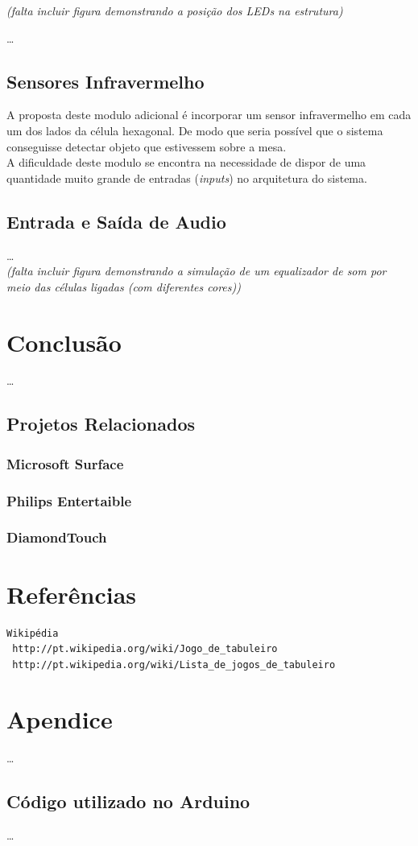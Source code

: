 \documentclass[a4paper,10pt]{article}
\begin{document}
{\it (falta incluir figura demonstrando a posição dos LEDs na estrutura)}

\ldots

\subsection{Sensores Infravermelho}

A proposta deste modulo adicional é incorporar um sensor infravermelho em cada um dos lados da célula hexagonal. De modo que seria possível que o sistema conseguisse detectar objeto que estivessem sobre a mesa. \\

A dificuldade deste modulo se encontra na necessidade de dispor de uma quantidade muito grande de entradas ({\it inputs}) no arquitetura do sistema.

\subsection{Entrada e Saída de Audio}

\ldots \\

{\it (falta incluir figura demonstrando a simulação de um equalizador de som por meio das células ligadas (com diferentes cores))}

\section{Conclusão}

\ldots

\subsection{Projetos Relacionados}

\subsubsection{Microsoft Surface}
\subsubsection{Philips Entertaible}
\subsubsection{DiamondTouch}

\section{Referências}

\begin{verbatim}
Wikipédia
 http://pt.wikipedia.org/wiki/Jogo_de_tabuleiro
 http://pt.wikipedia.org/wiki/Lista_de_jogos_de_tabuleiro 
\end{verbatim}

\section{Apendice}

\ldots

\subsection{Código utilizado no Arduino}

\ldots
\end{document}
